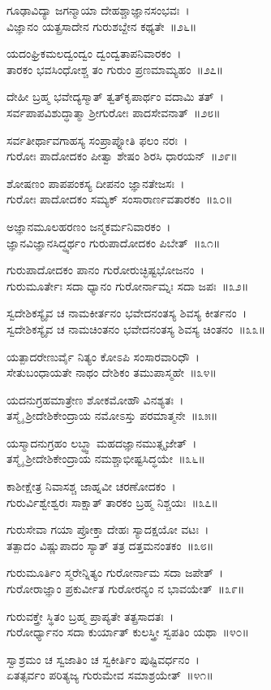 ಗೂಢಾವಿದ್ಯಾ ಜಗನ್ಮಾಯಾ ದೇಹಶ್ಚಾಜ್ಞಾನಸಂಭವಃ~।\\
ವಿಜ್ಞಾನಂ ಯತ್ಪ್ರಸಾದೇನ ಗುರುಶಬ್ದೇನ ಕಥ್ಯತೇ~॥೨೬॥

ಯದಂಘ್ರಿಕಮಲದ್ವಂದ್ವಂ ದ್ವಂದ್ವತಾಪನಿವಾರಕಂ~।\\
ತಾರಕಂ ಭವಸಿಂಧೋಶ್ಚ ತಂ ಗುರುಂ ಪ್ರಣಮಾಮ್ಯಹಂ~॥೨೭॥

ದೇಹೀ ಬ್ರಹ್ಮ ಭವೇದ್ಯಸ್ಮಾತ್ ತ್ವತ್‌ಕೃಪಾರ್ಥಂ ವದಾಮಿ ತತ್~।\\
ಸರ್ವಪಾಪವಿಶುದ್ಧಾತ್ಮಾ ಶ್ರೀಗುರೋಃ ಪಾದಸೇವನಾತ್~॥೨೮॥

ಸರ್ವತೀರ್ಥಾವಗಾಹಸ್ಯ ಸಂಪ್ರಾಪ್ನೋತಿ ಫಲಂ ನರಃ~।\\
ಗುರೋಃ ಪಾದೋದಕಂ ಪೀತ್ವಾ ಶೇಷಂ ಶಿರಸಿ ಧಾರಯನ್~॥೨೯॥

ಶೋಷಣಂ ಪಾಪಪಂಕಸ್ಯ ದೀಪನಂ ಜ್ಞಾನತೇಜಸಃ~।\\
ಗುರೋಃ ಪಾದೋದಕಂ ಸಮ್ಯಕ್ ಸಂಸಾರಾರ್ಣವತಾರಕಂ~॥೩೦॥

ಅಜ್ಞಾನಮೂಲಹರಣಂ ಜನ್ಮಕರ್ಮನಿವಾರಕಂ~।\\
ಜ್ಞಾನವಿಜ್ಞಾನಸಿದ್ಧ್ಯರ್ಥಂ ಗುರುಪಾದೋದಕಂ ಪಿಬೇತ್~॥೩೧॥

ಗುರುಪಾದೋದಕಂ ಪಾನಂ ಗುರೋರುಚ್ಛಿಷ್ಟಭೋಜನಂ~।\\
ಗುರುಮೂರ್ತೇಃ ಸದಾ ಧ್ಯಾನಂ ಗುರೋರ್ನಾಮ್ನಃ ಸದಾ ಜಪಃ~॥೩೨॥

ಸ್ವದೇಶಿಕಸ್ಯೈವ ಚ ನಾಮಕೀರ್ತನಂ ಭವೇದನಂತಸ್ಯ ಶಿವಸ್ಯ ಕೀರ್ತನಂ~।\\
ಸ್ವದೇಶಿಕಸ್ಯೈವ ಚ ನಾಮಚಿಂತನಂ ಭವೇದನಂತಸ್ಯ ಶಿವಸ್ಯ ಚಿಂತನಂ~॥೩೩॥

ಯತ್ಪಾದರೇಣುರ್ವೈ ನಿತ್ಯಂ ಕೋಽಪಿ ಸಂಸಾರವಾರಿಧೌ~।\\
ಸೇತುಬಂಧಾಯತೇ ನಾಥಂ ದೇಶಿಕಂ ತಮುಪಾಸ್ಮಹೇ~॥೩೪॥

ಯದನುಗ್ರಹಮಾತ್ರೇಣ ಶೋಕಮೋಹೌ ವಿನಶ್ಯತಃ~।\\
ತಸ್ಮೈ ಶ್ರೀದೇಶಿಕೇಂದ್ರಾಯ ನಮೋಽಸ್ತು ಪರಮಾತ್ಮನೇ~॥೩೫॥

ಯಸ್ಮಾದನುಗ್ರಹಂ ಲಬ್ಧ್ವಾ ಮಹದಜ್ಞಾನಮುತ್ಸೃಜೇತ್~।\\
ತಸ್ಮೈ ಶ್ರೀದೇಶಿಕೇಂದ್ರಾಯ ನಮಶ್ಚಾಭೀಷ್ಟಸಿದ್ಧಯೇ~॥೩೬॥

ಕಾಶೀಕ್ಷೇತ್ರ ನಿವಾಸಶ್ಚ ಜಾಹ್ನವೀ ಚರಣೋದಕಂ~।\\
ಗುರುರ್ವಿಶ್ವೇಶ್ವರಃ ಸಾಕ್ಷಾತ್ ತಾರಕಂ ಬ್ರಹ್ಮ ನಿಶ್ಚಯಃ~॥೩೭॥

ಗುರುಸೇವಾ ಗಯಾ ಪ್ರೋಕ್ತಾ ದೇಹಃ ಸ್ಯಾದಕ್ಷಯೋ ವಟಃ~।\\
ತತ್ಪಾದಂ ವಿಷ್ಣುಪಾದಂ ಸ್ಯಾತ್ ತತ್ರ ದತ್ತಮನಂತಕಂ~॥೩೮॥

ಗುರುಮೂರ್ತಿಂ ಸ್ಮರೇನ್ನಿತ್ಯಂ ಗುರೋರ್ನಾಮ ಸದಾ ಜಪೇತ್~।\\
ಗುರೋರಾಜ್ಞಾಂ ಪ್ರಕುರ್ವೀತ ಗುರೋರನ್ಯಂ ನ ಭಾವಯೇತ್~॥೩೯॥

ಗುರುವಕ್ತ್ರೇ ಸ್ಥಿತಂ ಬ್ರಹ್ಮ ಪ್ರಾಪ್ಯತೇ ತತ್ಪ್ರಸಾದತಃ~।\\
ಗುರೋರ್ಧ್ಯಾನಂ ಸದಾ ಕುರ್ಯಾತ್ ಕುಲಸ್ತ್ರೀ ಸ್ವಪತಿಂ ಯಥಾ~॥೪೦॥

ಸ್ವಾಶ್ರಮಂ ಚ ಸ್ವಜಾತಿಂ ಚ ಸ್ವಕೀರ್ತಿಂ ಪುಷ್ಟಿವರ್ಧನಂ~।\\
ಏತತ್ಸರ್ವಂ ಪರಿತ್ಯಜ್ಯ ಗುರುಮೇವ ಸಮಾಶ್ರಯೇತ್~॥೪೧॥

